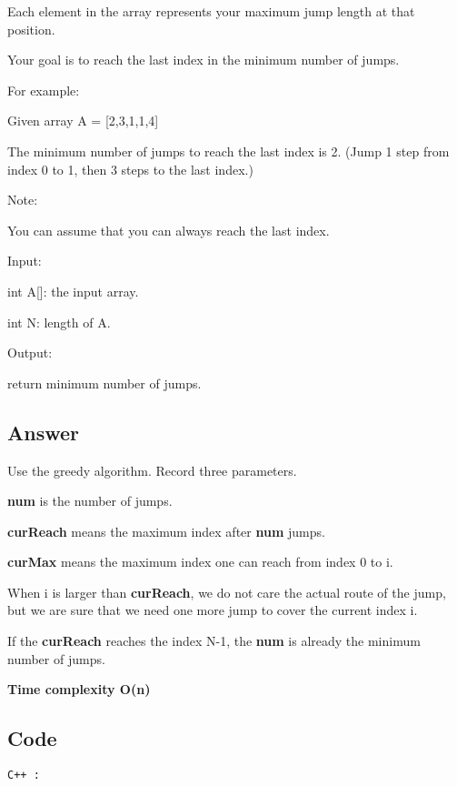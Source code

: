 Each element in the array represents your maximum jump length at that position.

Your goal is to reach the last index in the minimum number of jumps.

For example:

Given array A = [2,3,1,1,4]

The minimum number of jumps to reach the last index is 2. (Jump 1 step from index 0 to 1, then 3 steps to the last index.)

Note:

You can assume that you can always reach the last index.

Input:

int A[]: the input array.

int N: length of A.

Output:

return minimum number of jumps.


\subsection{Answer}
Use the greedy algorithm. Record three parameters.

\textbf{num} is the number of jumps.

\textbf{curReach} means the maximum index after \textbf{num} jumps.

\textbf{curMax} means the maximum index one can reach from index 0 to i.

When i is larger than \textbf{curReach}, we do not care the actual route of the jump, but we are sure that we need one more jump to cover the current index i.

If the \textbf{curReach} reaches the index N-1, the \textbf{num} is already the minimum number of jumps.

\textbf{\color{red}Time complexity O(n)}
\subsection{Code}
\texttt{C++ :}


\newpage
\section{}
